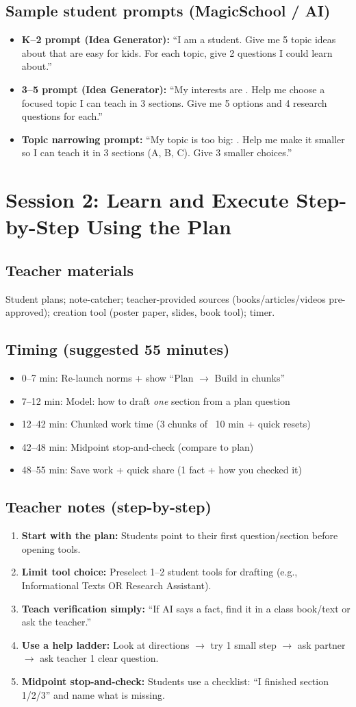 \documentclass[11pt]{article}
\newcommand{\Session}[1]{\section*{#1}}
\newcommand{\Sub}[1]{\subsection*{#1}}
\begin{document}
\Sub{Sample student prompts (MagicSchool / AI)}
\begin{itemize}[leftmargin=*]
  \item \textbf{K--2 prompt (Idea Generator):}
  ``I am a student. Give me 5 topic ideas about \underline{\hspace{2cm}} that are easy for kids. For each topic, give 2 questions I could learn about.''
  \item \textbf{3--5 prompt (Idea Generator):}
  ``My interests are \underline{\hspace{2cm}}. Help me choose a focused topic I can teach in 3 sections. Give me 5 options and 4 research questions for each.''
  \item \textbf{Topic narrowing prompt:}
  ``My topic is too big: \underline{\hspace{2cm}}. Help me make it smaller so I can teach it in 3 sections (A, B, C). Give 3 smaller choices.''
\end{itemize}

\newpage
\Session{Session 2: Learn and Execute Step-by-Step Using the Plan}
\Sub{Teacher materials}
Student plans; note-catcher; teacher-provided sources (books/articles/videos pre-approved); creation tool (poster paper, slides, book tool); timer.

\Sub{Timing (suggested 55 minutes)}
\begin{itemize}[leftmargin=*]
  \item 0--7 min: Re-launch norms + show ``Plan $\rightarrow$ Build in chunks''
  \item 7--12 min: Model: how to draft \emph{one} section from a plan question
  \item 12--42 min: Chunked work time (3 chunks of ~10 min + quick resets)
  \item 42--48 min: Midpoint stop-and-check (compare to plan)
  \item 48--55 min: Save work + quick share (1 fact + how you checked it)
\end{itemize}

\Sub{Teacher notes (step-by-step)}
\begin{enumerate}[leftmargin=*]
  \item \textbf{Start with the plan:}
  Students point to their first question/section before opening tools.
  \item \textbf{Limit tool choice:}
  Preselect 1--2 student tools for drafting (e.g., Informational Texts OR Research Assistant).
  \item \textbf{Teach verification simply:}
  ``If AI says a fact, find it in a class book/text or ask the teacher.''
  \item \textbf{Use a help ladder:}
  Look at directions $\rightarrow$ try 1 small step $\rightarrow$ ask partner $\rightarrow$ ask teacher 1 clear question.
  \item \textbf{Midpoint stop-and-check:}
  Students use a checklist: ``I finished section 1/2/3'' and name what is missing.
\end{enumerate}
\end{document}
